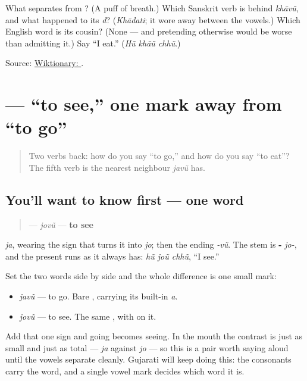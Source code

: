 \begin{tcolorbox}[breakable,colback=teal!4,colframe=teal!35!black,title={Before you move on}]
What separates \textbf{} from \textbf{}? (A puff of breath.) Which Sanskrit verb is behind \emph{khāvũ}, and what happened to its \emph{d}? (\emph{Khādati}; it wore away between the vowels.) Which English word is its cousin? (None — and pretending otherwise would be worse than admitting it.) Say \textquotedblleft{}I eat.\textquotedblright{} (\emph{Hũ khāũ chhũ}.)

Source: \href{https://en.wiktionary.org/wiki/\%E0\%AA\%96\%E0\%AA\%BE\%E0\%AA\%B5\%E0\%AB\%81\%E0\%AA\%82}{Wiktionary: }.
\end{tcolorbox}
\section[jovũ]{ — \textquotedblleft{}to see,\textquotedblright{} one mark away from \textquotedblleft{}to go\textquotedblright{}}

\label{lesson:GU-C07-jovun}



\begin{quote}
Two verbs back: how do you say \textquotedblleft{}to go,\textquotedblright{} and how do you say \textquotedblleft{}to eat\textquotedblright{}? The fifth verb is the nearest neighbour \emph{javũ} has.
\end{quote}

\subsection*{You'll want to know first — one word}
\begin{quote}
\textbf{} — \emph{jovũ} — \textbf{to see}
\end{quote}

\textbf{} \emph{ja}, wearing the sign \textbf{} that turns it into \emph{jo}; then the ending \textbf{} \emph{-vũ}. The stem is \textbf{-} \emph{jo-}, and the present runs as it always has: \emph{hũ joũ chhũ}, \textquotedblleft{}I see.\textquotedblright{}

\begin{grammarlens}[title={What you've built: one mark apart}]
Set the two words side by side and the whole difference is one small mark:

\begin{itemize}
\raggedright
  \item \textbf{} \emph{javũ} — to go. Bare \textbf{}, carrying its built-in \emph{a}.
  \item \textbf{} \emph{jovũ} — to see. The same \textbf{}, with \textbf{} on it.
\end{itemize}

Add that one sign and going becomes seeing. In the mouth the contrast is just as small and just as total — \emph{ja} against \emph{jo} — so this is a pair worth saying aloud until the vowels separate cleanly. Gujarati will keep doing this: the consonants carry the word, and a single vowel mark decides which word it is.
\end{grammarlens}

